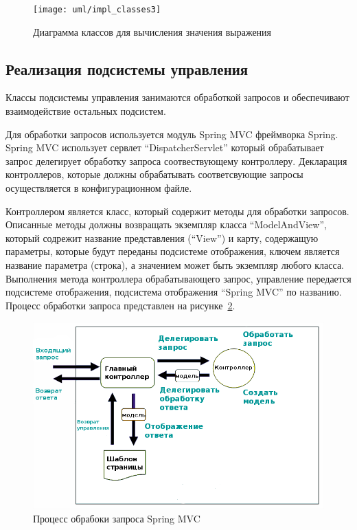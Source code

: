 \documentclass[14pt,a4paper]{reportmod}
\begin{document}
\begin{figure}
  \centering
  \texttt{[image: uml/impl\_classes3]}
  \caption{Диаграмма классов для вычисления значения выражения}
  \label{pic:evalclasses}
\end{figure}

\subsection{Реализация подсистемы управления}

Классы подсистемы управления занимаются обработкой запросов и обеспечивают взаимодействие остальных подсистем.


Для обработки запросов используется модуль Spring MVC фреймворка Spring. Spring MVC использует сервлет ``DispatcherServlet'' который обрабатывает запрос делегирует обработку запроса соотвествующему контроллеру. Декларация контроллеров, которые должны обрабатывать соответсвующие запросы осуществляется в конфигурационном файле.


Контроллером является класс, который содержит методы для обработки запросов. Описанные методы должны возвращать экземпляр класса ``ModelAndView'', который содрежит название представления (``View'') и карту, содержащую параметры, которые будут переданы подсистеме отображения, ключем является название параметра (строка), а значением может быть экземпляр любого класса. Выполнения метода контроллера обрабатывающего запрос, управление передается подсистеме отображения, подсистема отображения ``Spring MVC'' по названию. Процесс обработки запроса представлен на рисунке~\ref{pic:springmvcref}.


\begin{figure}
  \centering
  \includegraphics[scale=0.5]{pics/springmvcreq}
  \caption{Процесс обрабоки запроса Spring MVC}
  \label{pic:springmvcref}
\end{figure}
\end{document}
